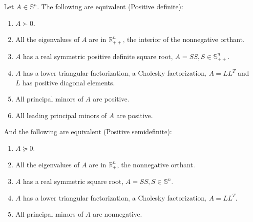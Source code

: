 \begin{proposition}
  Let $A \in \mathbb S^n$. The following are equivalent (Positive definite):
  \begin{enumerate}
    \item $A \succ 0$.
    \item All the eigenvalues of $A$ are in $\mathbb R^n_{++}$, the interior of the nonnegative orthant.
    \item $A$ has a real symmetric positive definite square root, $A = SS, S \in \mathbb S^n_{++}$.
    \item $A$ has a lower triangular factorization, a Cholesky factorization, $A = LL^T$ and $L$ has positive diagonal elements.
    \item All principal minors of $A$ are positive.
    \item All leading principal minors of $A$ are positive.
  \end{enumerate}
  And the following are equivalent (Positive semidefinite):
  \begin{enumerate}
    \item $A \succeq 0$.
    \item All the eigenvalues of $A$ are in $\mathbb R^n_{+}$, the nonnegative orthant.
    \item $A$ has a real symmetric square root, $A = SS, S \in \mathbb S^n$.
    \item $A$ has a lower triangular factorization, a Cholesky factorization, $A = LL^T$.
    \item All principal minors of $A$ are nonnegative.
  \end{enumerate}
\end{proposition}

